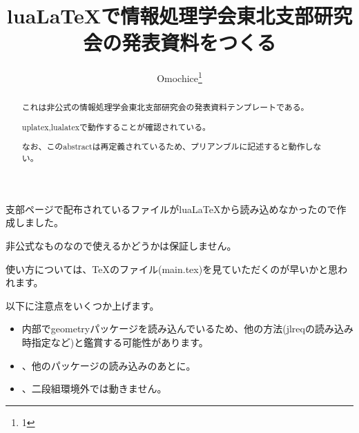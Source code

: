\documentclass[twocolumn,paper=a4paper,landscape,fontsize=9pt]{jlreq}
\title{luaLaTeXで情報処理学会東北支部研究会の発表資料をつくる}
\author{Omochice\thanks{1}}
\begin{document}

\maketitle

\begin{abstract}
  これは非公式の情報処理学会東北支部研究会の発表資料テンプレートである。

  uplatex,lualatexで動作することが確認されている。

  なお、このabstractは再定義されているため、プリアンブルに記述すると動作しない。
\end{abstract}

支部ページ\cite{ipsjTohoku}で配布されているファイルがluaLaTeXから読み込めなかったので作成しました。

非公式なものなので使えるかどうかは保証しません。

使い方については、TeXのファイル(main.tex)を見ていただくのが早いかと思われます。

以下に注意点をいくつか上げます。

\begin{itemize}
  \item 内部でgeometryパッケージを読み込んでいるため、他の方法(jlreqの読み込み時指定など)と鑑賞する可能性があります。
  \item \string{}\string{}、他のパッケージの読み込みのあとに\string{}。
  \item \string{}、二段組環境外では動きません。
\end{itemize}


\printbibliography[title=参考文献]
\end{document}
